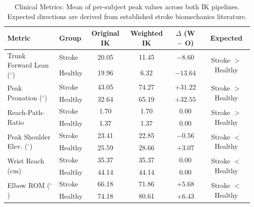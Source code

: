 \documentclass[12pt, a4paper]{article}
\begin{document}
\clearpage
\begin{table}[h]
  \centering
  \caption{Clinical Metrics: Mean of per-subject peak values across both IK pipelines. Expected directions are derived from established stroke biomechanics literature.}
  \vspace{0.5em}
  \begin{tabular}{llcccc}
    \toprule
    \textbf{Metric} & \textbf{Group} & \textbf{Original IK} & \textbf{Weighted IK} & \textbf{$\Delta$ (W $-$ O)} & \textbf{Expected} \\
    \midrule
    \multirow{2}{*}{Trunk Forward Lean ($^{\circ}$)} & Stroke & 20.05 & 11.45 & $-8.60$ & \multirow{2}{*}{Stroke $>$ Healthy} \\
                                                     & Healthy & 19.96 & 6.32 & $-13.64$ & \\
    \midrule
    \multirow{2}{*}{Peak Pronation ($^{\circ}$)}     & Stroke & 43.05 & 74.27 & $+31.22$ & \multirow{2}{*}{Stroke $>$ Healthy} \\
                                                     & Healthy & 32.64 & 65.19 & $+32.55$ & \\
    \midrule
    \multirow{2}{*}{Reach-Path-Ratio}                & Stroke & 1.70 & 1.70 & $0.00$ & \multirow{2}{*}{Stroke $>$ Healthy} \\
                                                     & Healthy & 1.37 & 1.37 & $0.00$ & \\
    \midrule
    \multirow{2}{*}{Peak Shoulder Elev. ($^{\circ}$)}& Stroke & 23.41 & 22.85 & $-0.56$ & \multirow{2}{*}{Stroke $<$ Healthy} \\
                                                     & Healthy & 25.59 & 28.66 & $+3.07$ & \\
    \midrule
    \multirow{2}{*}{Wrist Reach (cm)}                & Stroke & 35.37 & 35.37 & $0.00$ & \multirow{2}{*}{Stroke $<$ Healthy} \\
                                                     & Healthy & 44.14 & 44.14 & $0.00$ & \\
    \midrule
    \multirow{2}{*}{Elbow ROM ($^{\circ}$)}          & Stroke & 66.18 & 71.86 & $+5.68$ & \multirow{2}{*}{Stroke $<$ Healthy} \\
                                                     & Healthy & 74.18 & 80.61 & $+6.43$ & \\
    \bottomrule
  \end{tabular}
\end{table}
\end{document}
